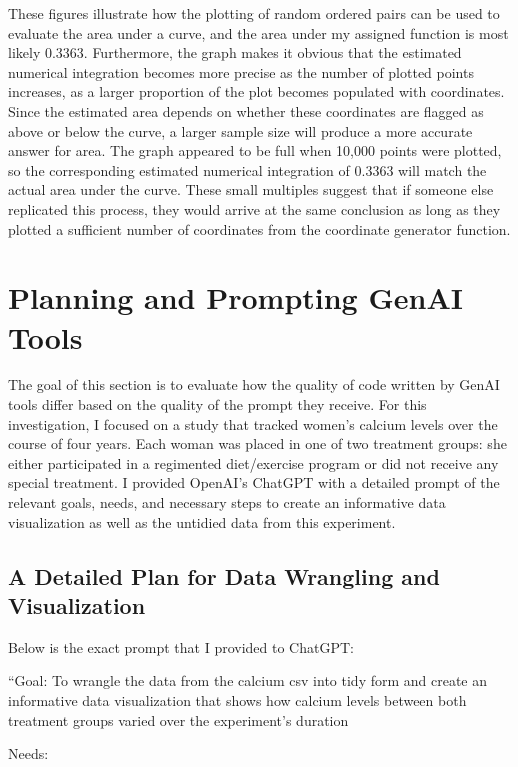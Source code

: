 \documentclass[
  letterpaper,
  DIV=11,
  numbers=noendperiod]{scrartcl}
\begin{document}
These figures illustrate how the plotting of random ordered pairs can be
used to evaluate the area under a curve, and the area under my assigned
function is most likely 0.3363. Furthermore, the graph makes it obvious
that the estimated numerical integration becomes more precise as the
number of plotted points increases, as a larger proportion of the plot
becomes populated with coordinates. Since the estimated area depends on
whether these coordinates are flagged as above or below the curve, a
larger sample size will produce a more accurate answer for area. The
graph appeared to be full when 10,000 points were plotted, so the
corresponding estimated numerical integration of 0.3363 will match the
actual area under the curve. These small multiples suggest that if
someone else replicated this process, they would arrive at the same
conclusion as long as they plotted a sufficient number of coordinates
from the coordinate generator function.

\section{Planning and Prompting GenAI
Tools}\label{planning-and-prompting-genai-tools}

The goal of this section is to evaluate how the quality of code written
by GenAI tools differ based on the quality of the prompt they receive.
For this investigation, I focused on a study that tracked women's
calcium levels over the course of four years. Each woman was placed in
one of two treatment groups: she either participated in a regimented
diet/exercise program or did not receive any special treatment. I
provided OpenAI's ChatGPT with a detailed prompt of the relevant goals,
needs, and necessary steps to create an informative data visualization
as well as the untidied data from this experiment.

\subsection{A Detailed Plan for Data Wrangling and
Visualization}\label{a-detailed-plan-for-data-wrangling-and-visualization}

Below is the exact prompt that I provided to ChatGPT:

``Goal: To wrangle the data from the calcium csv into tidy form and
create an informative data visualization that shows how calcium levels
between both treatment groups varied over the experiment's duration

Needs:
\end{document}
